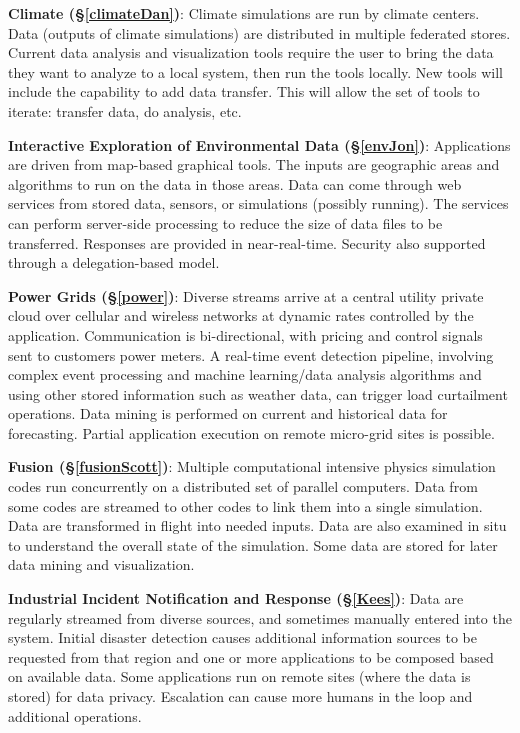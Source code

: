 {\bf Climate (\S\ref{climateDan})}: Climate simulations are run by climate centers.  Data (outputs of climate simulations) are distributed in multiple federated stores.  Current data analysis and visualization tools require the user to bring the data they want to analyze to a local system, then run the tools locally.  New tools will include the capability to add data transfer.  This will allow the set of tools to iterate: transfer data, do analysis, etc.

{\bf Interactive Exploration of Environmental Data (\S\ref{envJon})}: Applications are driven from map-based graphical tools.  The inputs are geographic areas and algorithms to run on the data in those areas. Data can come through web services from stored data, sensors, or simulations (possibly running).  The services can perform server-side processing to reduce the size of data files to be transferred. Responses are provided in near-real-time.  Security also supported through a delegation-based model.

{\bf Power Grids (\S\ref{power})}: Diverse streams arrive at a central utility private cloud over cellular and wireless networks at dynamic rates controlled by the application. Communication is bi-directional, with pricing and control signals sent to customers power meters.  A real-time event detection pipeline, involving complex event processing and machine learning/data analysis algorithms and using other stored information such as weather data, can trigger load curtailment operations. Data mining is performed on current and historical data for forecasting. Partial application execution on remote micro-grid sites is possible.

{\bf Fusion (\S\ref{fusionScott})}: Multiple computational intensive
physics simulation codes run concurrently on a distributed set of
parallel computers.  Data from some codes are streamed to other codes
to link them into a single simulation.  Data are transformed in flight
into needed inputs.  Data are also examined in situ to understand the
overall state of the simulation.  Some data are stored for later data
mining and visualization.

{\bf Industrial Incident Notification and Response (\S\ref{Kees})}:
Data are regularly streamed from diverse sources, and sometimes
manually entered into the system. Initial disaster detection causes
additional information sources to be requested from that region and
one or more applications to be composed based on available data. Some
applications run on remote sites (where the data is stored) for data
privacy. Escalation can cause more humans in the loop and additional
operations.

